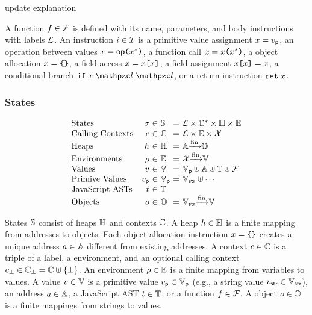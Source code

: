 \todo update explanation

A function $f \in \mathcal{F}$ is defined with its name, parameters, and body
instructions with labels $\mathcal{L}$.  An instruction $i \in \mathcal{I}$ is
a primitive value assignment $x = v_{\textsf{p}}$,
an operation between values $x = \textsf{op} \texttt{(} x^* \texttt{)}$,
a function call $x = x \texttt{(} x^* \texttt{)}$,
a object allocation $x = \texttt{\{} \texttt{\}}$,
a field access $x = x \texttt{[} x \texttt{]}$,
a field assignment $x \texttt{[} x \texttt{]} = x$,
a conditional branch $\kwif \; x \; \lab \; \lab$,
or a return instruction $\texttt{ret} \; x$.


\subsubsection{States}

\[
  \begin{array}{lr@{~}c@{~}l@{~}c@{~}l}
    \text{States} & \st &\in& \stset &=&
    \labset \times \ctxtset^* \times \heapset \times \envset\\

    \text{Calling Contexts} & \ctxt &\in& \ctxtset &=&
    \labset \times \envset \times \varset\\

    \text{Heaps} & \heap &\in& \heapset &=&
    \addrset \finmap \objset\\

    \text{Environments} & \env &\in& \envset &=&
    \varset \finmap \valset\\

    \text{Values} & \val &\in& \valset &=&
    \pvalset \uplus \addrset \uplus \treeset \uplus \funcset\\

    \text{Primive Values} & \pval &\in& \pvalset &=&
    \strset \uplus \cdots\\

    \text{JavaScript ASTs} & \tree &\in& \treeset\\

    \text{Objects} & \obj &\in& \objset &=&
    \strset \finmap \valset\\
  \end{array}
\]

States $\mathbb{S}$ consist of heaps $\mathbb{H}$ and contexts $\mathbb{C}$.  A heap
$h \in \mathbb{H}$ is a finite mapping from addresses to objects.  Each object
allocation instruction $x = \texttt{\{} \texttt{\}}$ creates a unique address $a \in
\mathbb{A}$ different from existing addresses.  A context $c \in \mathbb{C}$ is
a triple of a label, a environment, and an optional calling context $c_\bot
\in \mathbb{C}_\bot = \mathbb{C} \uplus \{ \bot \}$.  An environment $\rho \in
\mathbb{E}$ is a finite mapping from variables to values. A value $v \in
\mathbb{V}$ is a primitive value $v_{\textsf{p}} \in \mathbb{V}_{\textsf{p}}$ (e.g., a string value $v_{\textsf{str}}
\in \mathbb{V}_{\textsf{str}}$), an address $a \in \mathbb{A}$, a JavaScript AST $t \in
\mathbb{T}$, or a function $f \in \mathcal{F}$.  A object $o \in \mathbb{O}$ is a
finite mappings from strings to values.

